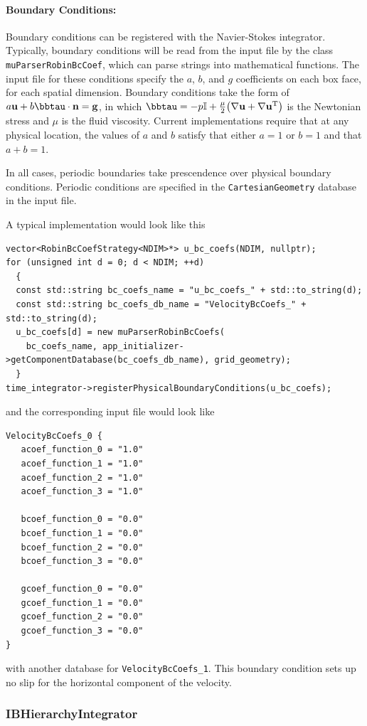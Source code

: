 \documentclass{article}
\newcommand{\bg}{\mathbf{g}}
\newcommand{\bn}{\mathbf{n}}
\newcommand{\bu}{\mathbf{u}}
\newcommand{\bbI}{\mathbb{I}}
\newcommand{\grad}{\nabla}
\newcommand{\parens}[1]{\mathopen{}\left(#1\right)\mathclose{}}
\begin{document}
\paragraph{Boundary Conditions:}
Boundary conditions can be registered with the Navier-Stokes integrator. Typically, boundary conditions will be read from the input file by the class \verb|muParserRobinBcCoef|, which can parse strings into mathematical functions. The input file for these conditions specify the $a$, $b$, and $g$ coefficients on each box face, for each spatial dimension. Boundary conditions take the form of $ a\bu + b\bbtau\cdot\bn = \bg$, in which $\bbtau = -p\bbI + \frac{\mu}{2}\parens{\grad\bu + \grad\bu^\text{T}}$ is the Newtonian stress and $\mu$ is the fluid viscosity. Current implementations require that at any physical location, the values of $a$ and $b$ satisfy that either $a = 1$ or $b = 1$ and that $a + b = 1$.

In all cases, periodic boundaries take prescendence over physical boundary conditions. Periodic conditions are specified in the \verb|CartesianGeometry| database in the input file.

A typical implementation would look like this
\begin{verbatim}
vector<RobinBcCoefStrategy<NDIM>*> u_bc_coefs(NDIM, nullptr);
for (unsigned int d = 0; d < NDIM; ++d)
  {
  const std::string bc_coefs_name = "u_bc_coefs_" + std::to_string(d);
  const std::string bc_coefs_db_name = "VelocityBcCoefs_" + std::to_string(d);
  u_bc_coefs[d] = new muParserRobinBcCoefs(
    bc_coefs_name, app_initializer->getComponentDatabase(bc_coefs_db_name), grid_geometry);
  }
time_integrator->registerPhysicalBoundaryConditions(u_bc_coefs);
\end{verbatim}
and the corresponding input file would look like
\begin{verbatim}
VelocityBcCoefs_0 {
   acoef_function_0 = "1.0"
   acoef_function_1 = "1.0"
   acoef_function_2 = "1.0"
   acoef_function_3 = "1.0"

   bcoef_function_0 = "0.0"
   bcoef_function_1 = "0.0"
   bcoef_function_2 = "0.0"
   bcoef_function_3 = "0.0"

   gcoef_function_0 = "0.0"
   gcoef_function_1 = "0.0"
   gcoef_function_2 = "0.0"
   gcoef_function_3 = "0.0"
}
\end{verbatim}
with another database for \verb|VelocityBcCoefs_1|. This boundary condition sets up no slip for the horizontal component of the velocity.

\subsubsection{IBHierarchyIntegrator}
\end{document}
